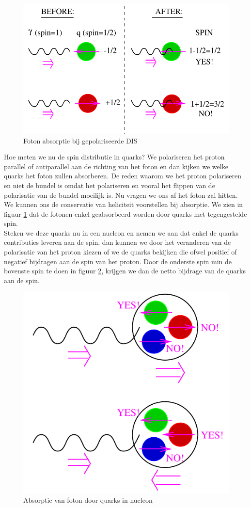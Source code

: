 \documentclass[../main.tex]{subfiles}
\begin{document}
\begin{figure}[h]
    \centering
    \includegraphics[width=0.8\linewidth]{DIS_nucleon_structuur_pdf/foton_abs_hel.png}
    \caption{Foton absorptie bij gepolariseerde DIS}%
    \label{fig:foton_abs_hel}
\end{figure}

Hoe meten we nu de spin distributie in quarks? We polariseren het proton parallel of antiparallel aan de richting van het foton en dan kijken we welke quarks het foton zullen absorberen. De reden waarom we het proton polariseren en niet de bundel is omdat het polariseren en vooral het flippen van de polarisatie van de bundel moeilijk is. Nu vragen we ons af het foton zal hitten. We kunnen ons de conservatie van heliciteit voorstellen bij absorptie. We zien in figuur \ref{fig:foton_abs_hel} dat de fotonen enkel geabsorbeerd worden door quarks met tegengestelde spin.\\
Steken we deze quarks nu in een nucleon en nemen we aan dat enkel de quarks contributies leveren aan de spin, dan kunnen we door het veranderen van de polarisatie van het proton kiezen of we de quarks bekijken die ofwel positief of negatief bijdragen aan de spin van het proton. Door de onderste spin min de bovenste spin te doen in figuur \ref{fig:foton_abs_pol}, krijgen we dan de netto bijdrage van de quarks aan de spin.

\begin{figure}[h]
    \centering
    \includegraphics[width=0.5\linewidth]{DIS_nucleon_structuur_pdf/foton_abs_pol.png}
    \caption{Absorptie van foton door quarks in nucleon}%
    \label{fig:foton_abs_pol}
\end{figure}
\end{document}
